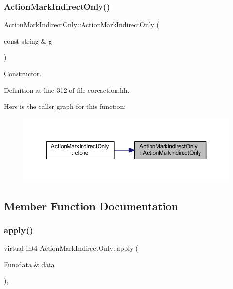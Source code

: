 \subsubsection{\texorpdfstring{ActionMarkIndirectOnly()}{ActionMarkIndirectOnly()}}
{\footnotesize\ttfamily Action\+Mark\+Indirect\+Only\+::\+Action\+Mark\+Indirect\+Only (\begin{DoxyParamCaption}\item[{const string \&}]{g }\end{DoxyParamCaption})\hspace{0.3cm}{\ttfamily [inline]}}



\mbox{\hyperlink{class_constructor}{Constructor}}. 



Definition at line 312 of file coreaction.\+hh.

Here is the caller graph for this function\+:
\nopagebreak
\begin{figure}[H]
\begin{center}
\leavevmode
\includegraphics[width=350pt]{class_action_mark_indirect_only_ab230cdfb530a3ef8f1c4ff4ad4c3fc9f_icgraph}
\end{center}
\end{figure}


\subsection{Member Function Documentation}
\mbox{\label{class_action_mark_indirect_only_aebf60dbaf803f470c8954cab93acc241}} 
\subsubsection{\texorpdfstring{apply()}{apply()}}
{\footnotesize\ttfamily virtual int4 Action\+Mark\+Indirect\+Only\+::apply (\begin{DoxyParamCaption}\item[{\mbox{\hyperlink{class_funcdata}{Funcdata}} \&}]{data }\end{DoxyParamCaption})\hspace{0.3cm}{\ttfamily [inline]}, {\ttfamily [virtual]}}



